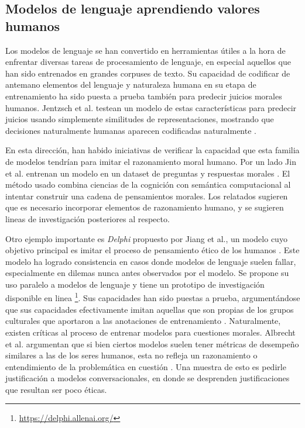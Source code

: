\documentclass[
	spanish, %
	letterpaper, oneside
]{article}
\begin{document}
\subsection{Modelos de lenguaje aprendiendo valores humanos}

Los modelos de lenguaje se han convertido en herramientas útiles a la hora de enfrentar diversas tareas de procesamiento de lenguaje, en especial aquellos que han sido entrenados en grandes corpuses de texto. Su capacidad de codificar de antemano elementos del lenguaje y naturaleza humana en su etapa de entrenamiento ha sido puesta a prueba también para predecir juicios morales humanos. Jentzsch et al. testean un modelo de estas características para predecir juicios usando simplemente similitudes de representaciones, mostrando que decisiones naturalmente humanas aparecen codificadas naturalmente \cite{use}.

\newp En esta dirección, han habido iniciativas de verificar la capacidad que esta familia de modelos tendrían para imitar el razonamiento moral humano. Por un lado Jin et al. entrenan un modelo en un dataset de preguntas y respuestas morales \cite{Jin}. El método usado combina ciencias de la cognición con semántica computacional al intentar construir una cadena de pensamientos morales. Los relatados sugieren que es necesario incorporar elementos de razonamiento humano, y se sugieren lineas de investigación posteriores al respecto.

\newp Otro ejemplo importante es \textit{Delphi} propuesto por Jiang et al., un modelo cuyo objetivo principal es imitar el proceso de pensamiento ético de los humanos \cite{Jiang}. Este modelo ha logrado consistencia en casos donde modelos de lenguaje suelen fallar, especialmente en dilemas nunca antes observados por el modelo. Se propone su uso paralelo a modelos de lenguaje y tiene un prototipo de investigación disponible en linea \footnote{\url{https://delphi.allenai.org/}}. Sus capacidades han sido puestas a prueba, argumentándose que sus capacidades efectivamente imitan aquellas que son propias de los grupos culturales que aportaron a las anotaciones de entrenamiento \cite{Fraser}. Naturalmente, existen críticas al proceso de entrenar modelos para cuestiones morales. Albrecht et al. argumentan que si bien ciertos modelos suelen tener métricas de desempeño similares a las de los seres humanos, esta no refleja un razonamiento o entendimiento de la problemática en cuestión \cite{Albrecht}. Una muestra de esto es pedirle justificación a modelos conversacionales, en donde se desprenden justificaciones que resultan ser poco éticas.
\end{document}
